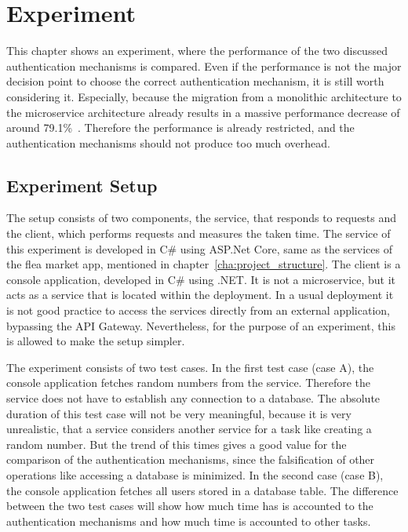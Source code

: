 \chapter{Experiment}
\label{cha:experiment}
This chapter shows an experiment, where the performance of the two discussed authentication mechanisms is compared.
Even if the performance is not the major decision point to choose the correct authentication mechanism, it is still worth considering it.
Especially, because the migration from a monolithic architecture to the microservice architecture already results in a massive performance decrease of around 79.1\%~\cite{ueda2016workload}.
Therefore the performance is already restricted, and the authentication mechanisms should not produce too much overhead.

\section{Experiment Setup}
The setup consists of two components, the service, that responds to requests and the client, which performs requests and measures the taken time.
The service of this experiment is developed in C\# using ASP.Net Core, same as the services of the flea market app, mentioned in chapter~\ref{cha:project_structure}.
The client is a console application, developed in C\# using .NET.
It is not a microservice, but it acts as a service that is located within the deployment.
In a usual deployment it is not good practice to access the services directly from an external application, bypassing the API Gateway.
Nevertheless, for the purpose of an experiment, this is allowed to make the setup simpler. 

The experiment consists of two test cases.
In the first test case (case A), the console application fetches random numbers from the service.
Therefore the service does not have to establish any connection to a database.
The absolute duration of this test case will not be very meaningful, because it is very unrealistic, that a service considers another service for a task like creating a random number.
But the trend of this times gives a good value for the comparison of the authentication mechanisms, since the falsification of other operations like accessing a database is minimized.
In the second case (case B), the console application fetches all users stored in a database table.
The difference between the two test cases will show how much time has is accounted to the authentication mechanisms and how much time is accounted to other tasks.

